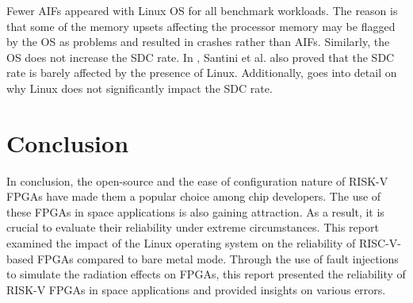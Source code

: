 \documentclass[conference]{IEEEtran}
\begin{document}
Fewer AIFs appeared with Linux OS for all benchmark workloads. The reason is that some of the memory upsets affecting the processor memory 
may be flagged by the OS as problems and resulted in crashes rather than AIFs. Similarly, the OS does not increase the SDC rate. In \cite{b6}, 
Santini et al. also proved that the SDC rate is barely affected by the presence of Linux. Additionally, \cite{b7} goes into detail on why
Linux does not significantly impact the SDC rate. 

\section{Conclusion}
In conclusion, the open-source and the ease of configuration nature of RISK-V FPGAs have made them a popular choice among chip developers. 
The use of these FPGAs in space applications is also gaining attraction. As a result, it is crucial to evaluate their reliability under extreme 
circumstances. This report examined the impact of the Linux operating system on the reliability of RISC-V-based FPGAs compared 
to bare metal mode. Through the use of fault injections to simulate the radiation effects on FPGAs, this report presented the reliability of 
RISK-V FPGAs in space applications and provided insights on various errors.
\end{document}
